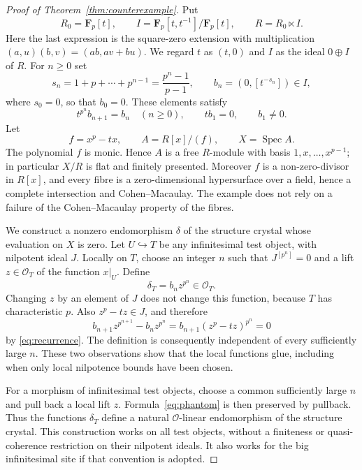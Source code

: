 \documentclass[11pt]{article}
\newcommand{\OO}{\mathcal O}\newcommand{\Fp}{\mathbf F_p}
\DeclareMathOperator{\Spec}{Spec}\DeclareMathOperator{\Hom}{Hom}
\theoremstyle{definition}\newtheorem{definition}[theorem]{Definition}
\theoremstyle{remark}\newtheorem{remark}[theorem]{Remark}
\begin{document}
\begin{proof}[Proof of Theorem~\ref{thm:counterexample}]
Put
\[
 R_0=\Fp[t],\qquad I=\Fp[t,t^{-1}]/\Fp[t],\qquad
 R=R_0\ltimes I.
\]
Here the last expression is the square-zero extension with multiplication
$(a,u)(b,v)=(ab,av+bu)$.  We regard $t$ as $(t,0)$ and $I$ as the ideal $0\oplus I$ of $R$.  For $n\geq0$ set
\[
 s_n=1+p+\cdots+p^{n-1}=\frac{p^n-1}{p-1},\qquad
 b_n=(0,[t^{-s_n}])\in I,
\]
where $s_0=0$, so that $b_0=0$.  These elements satisfy
\begin{equation}\label{eq:recurrence}
 t^{p^n}b_{n+1}=b_n\quad(n\geq0),\qquad
 tb_1=0,\qquad b_1\ne0.
\end{equation}
Let
\[
 f=x^p-tx,\qquad A=R[x]/(f),\qquad X=\Spec A.
\]
The polynomial $f$ is monic.  Hence $A$ is a free $R$-module with basis $1,x,\ldots,x^{p-1}$; in particular $X/R$ is flat and finitely presented.  Moreover $f$ is a non-zero-divisor in $R[x]$, and every fibre is a zero-dimensional hypersurface over a field, hence a complete intersection and Cohen--Macaulay.  The example does not rely on a failure of the Cohen--Macaulay property of the fibres.

We construct a nonzero endomorphism $\delta$ of the structure crystal whose evaluation on $X$ is zero.  Let $U\hookrightarrow T$ be any infinitesimal test object, with nilpotent ideal $J$.  Locally on $T$, choose an integer $n$ such that $J^{[p^n]}=0$ and a lift $z\in\OO_T$ of the function $x|_U$.  Define
\begin{equation}\label{eq:phantom}
                     \delta_T=b_nz^{p^n}\in\OO_T.
\end{equation}
Changing $z$ by an element of $J$ does not change this function, because $T$ has characteristic $p$.  Also $z^p-tz\in J$, and therefore
\[
 b_{n+1}z^{p^{n+1}}-b_nz^{p^n}
       =b_{n+1}(z^p-tz)^{p^n}=0
\]
by \eqref{eq:recurrence}.  The definition is consequently independent of every sufficiently large $n$.  These two observations show that the local functions glue, including when only local nilpotence bounds have been chosen.

For a morphism of infinitesimal test objects, choose a common sufficiently large $n$ and pull back a local lift $z$.  Formula~\eqref{eq:phantom} is then preserved by pullback.  Thus the functions $\delta_T$ define a natural $\OO$-linear endomorphism of the structure crystal.  This construction works on all test objects, without a finiteness or quasi-coherence restriction on their nilpotent ideals.  It also works for the big infinitesimal site if that convention is adopted.


\end{proof}
\end{document}
